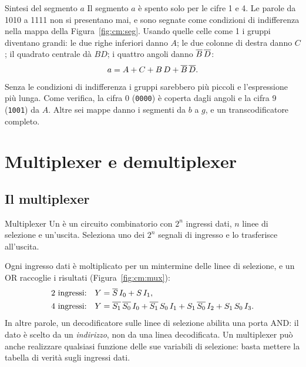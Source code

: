 \begin{example}{Sintesi del segmento $a$}
Il segmento $a$ è spento solo per le cifre 1 e 4. Le parole da 1010 a 1111 non
si presentano mai, e sono segnate come condizioni di indifferenza nella mappa
della Figura~\ref{fig:cm:seg}. Usando quelle celle come 1 i gruppi diventano
grandi: le due righe inferiori danno $A$; le due colonne di destra danno $C$;
il quadrato centrale dà $BD$; i quattro angoli danno $\overline{B}\,\overline{D}$:
\[ a = A + C + B\,D + \overline{B}\,\overline{D}. \]
Senza le condizioni di indifferenza i gruppi sarebbero più piccoli e
l'espressione più lunga. Come verifica, la cifra 0 (\texttt{0000}) è coperta
dagli angoli e la cifra 9 (\texttt{1001}) da $A$. Altre sei mappe danno i
segmenti da $b$ a $g$, e un transcodificatore completo.
\end{example}

\section{Multiplexer e demultiplexer}

\subsection{Il multiplexer}

\begin{definition}{Multiplexer}
Un  è un circuito combinatorio con $2^{n}$ ingressi dati, $n$
linee di selezione e un'uscita. Seleziona uno dei $2^{n}$ segnali di ingresso e
lo trasferisce all'uscita.
\end{definition}

Ogni ingresso dati è moltiplicato per un mintermine delle linee di selezione, e
un OR raccoglie i risultati (Figura~\ref{fig:cm:mux}):
\begin{align*}
\text{2 ingressi:}\quad & Y=\overline{S}\,I_0+S\,I_1,\\
\text{4 ingressi:}\quad & Y=\overline{S_1}\,\overline{S_0}\,I_0+\overline{S_1}\,S_0\,I_1+S_1\,\overline{S_0}\,I_2+S_1\,S_0\,I_3 .
\end{align*}
In altre parole, un decodificatore sulle linee di selezione abilita una porta
AND: il dato è scelto da un \emph{indirizzo}, non da una linea decodificata. Un
multiplexer può anche realizzare qualsiasi funzione delle sue variabili di
selezione: basta mettere la tabella di verità sugli ingressi dati.

